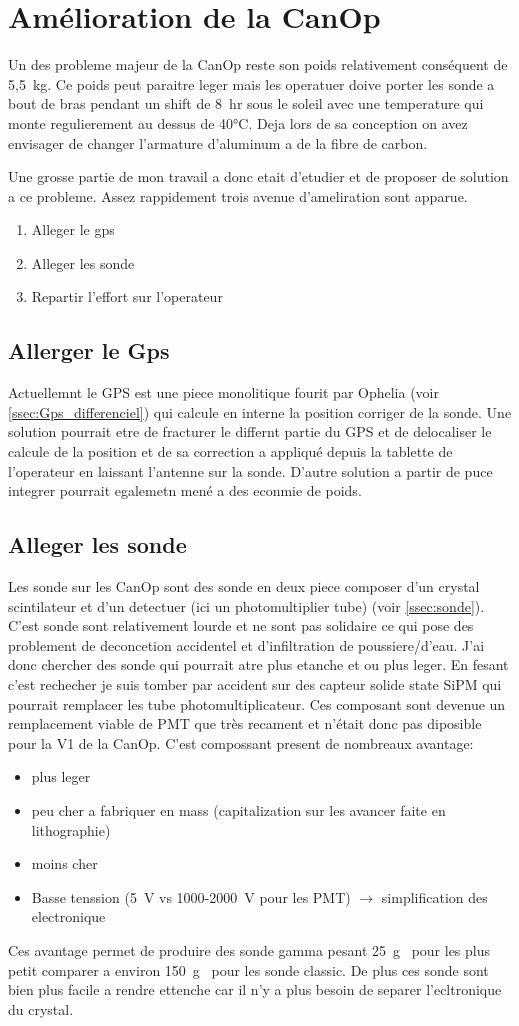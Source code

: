 \section{Amélioration de la CanOp}

Un des probleme majeur de la CanOp reste son poids relativement conséquent de 5,5~kg. Ce poids peut paraitre leger mais les operatuer doive porter les sonde a bout de bras pendant un shift de 8~hr sous le soleil avec une temperature qui monte regulierement au dessus de 40°C. Deja lors de sa conception on avez envisager de changer l'armature d'aluminum a de la fibre de carbon. 

Une grosse partie de mon travail a donc etait d'etudier et de proposer de solution a ce probleme. Assez rappidement trois avenue d'ameliration sont apparue.
\begin{enumerate}
    \item Alleger le gps 
    \item Alleger les sonde
    \item Repartir l'effort sur l'operateur
\end{enumerate}

\subsection{Allerger le Gps}
Actuellemnt le GPS est une piece monolitique fourit par Ophelia (voir \cref{ssec:Gps_differenciel}) qui calcule en interne la position corriger de la sonde. Une solution pourrait etre de fracturer le differnt partie du GPS et de delocaliser le calcule de la position et de sa correction a appliqué depuis la tablette de l'operateur en laissant l'antenne sur la sonde. D'autre solution a partir de puce integrer pourrait egalemetn mené a des econmie de poids.

\subsection{Alleger les sonde}
Les sonde sur les CanOp sont des sonde en deux piece composer d'un crystal scintilateur et d'un detectuer (ici un photomultiplier tube) (voir \cref{ssec:sonde}). C'est sonde sont relativement lourde et ne sont pas solidaire ce qui pose des problement de deconcetion accidentel et d'infiltration de poussiere/d'eau. 
J'ai donc chercher des sonde qui pourrait atre plus etanche et ou plus leger. En fesant c'est rechecher je suis tomber par accident sur des capteur solide state SiPM qui pourrait remplacer les tube photomultiplicateur. Ces composant sont devenue un remplacement viable de PMT que très recament et n'était donc pas diposible pour la V1 de la CanOp. C'est compossant present de nombreaux avantage:
\begin{itemize}
    \item plus leger
    \item peu cher a fabriquer en mass (capitalization sur les avancer faite en lithographie)
    \item moins cher
    \item Basse tenssion (5~V vs 1000-2000~V pour les PMT) $\rightarrow$ simplification des electronique
\end{itemize}

Ces avantage permet de produire des sonde gamma pesant 25~g~\cite{} pour les plus petit comparer a environ 150~g~\cite{} pour les sonde classic. De plus ces sonde sont bien plus facile a rendre ettenche car il n'y a plus besoin de separer l'ecltronique du crystal.
